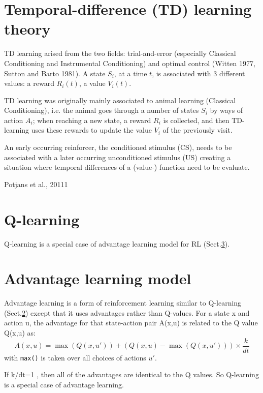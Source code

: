 \section{Temporal-difference (TD) learning theory}
\label{sec:RL_temporal-difference-learning}

TD learning arised from the two fields: trial-and-error (especially Classical
Conditioning and Instrumental Conditioning) and optimal control (Witten 1977,
Sutton and Barto 1981). A state $S_i$, at a time $t$, is associated with 3
different values: a reward $R_i(t)$, a value $V_i(t)$.

TD learning was originally mainly associated to animal learning (Classical
Conditioning), i.e. the animal goes through a number of states $S_i$ by ways of
action $A_i$; when reaching a new state, a reward $R_i$ is collected, and then
TD-learning uses these rewards to update the value $V_i$ of the previously
visit.

An early occurring reinforcer, the conditioned stimulus (CS), needs to be
associated with a later occurring unconditioned stimulus (US) creating a
situation where temporal differences of a (value-) function need to be evaluate.


Potjans et al., 20111

\section{Q-learning}
\label{sec:RL-Q-learning}

Q-learning is a special case of advantage learning model for RL
(Sect.\ref{sec:RL-advantage-learning}).

\section{Advantage learning model}
\label{sec:RL-advantage-learning}

Advantage learning is a form of reinforcement learning similar to Q-learning
(Sect.\ref{sec:RL-Q-learning}) except that it uses advantages rather than
Q-values. For a state x and action u, the advantage for that state-action pair
A(x,u) is related to the Q value Q(x,u) as:
\begin{equation}
A(x,u) = \max (Q(x,u')) + (Q(x,u) - \max(Q(x,u'))) \times \frac{k}{dt}
\end{equation}
with \verb!max()! is taken over all choices of actions $u'$.

If k/dt=1 , then all of the advantages are identical to the Q values. So
Q-learning is a special case of advantage learning.


